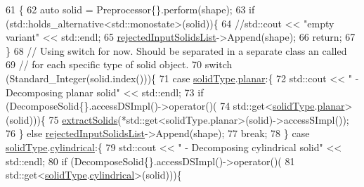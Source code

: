 \begin{DoxyCode}
61                                                                  \{
62     \textcolor{keyword}{auto} solid = Preprocessor\{\}.perform(shape);
63     \textcolor{keywordflow}{if} (std::holds\_alternative<std::monostate>(solid))\{
64         \textcolor{comment}{//std::cout << "empty variant" << std::endl;}
65         \hyperlink{classMcCAD_1_1Decomposition_1_1Decompose_1_1Impl_afa4c71b9552009320911095b0e9c638e}{rejectedInputSolidsList}->Append(shape);
66         \textcolor{keywordflow}{return};
67     \}
68     \textcolor{comment}{// Using switch for now. Should be separated in a separate class an called}
69     \textcolor{comment}{// for each specific type of solid object.}
70     \textcolor{keywordflow}{switch} (Standard\_Integer(solid.index()))\{
71     \textcolor{keywordflow}{case} \hyperlink{classMcCAD_1_1Decomposition_1_1Decompose_1_1Impl_a4d66091bde14a60985a5998376612a6c}{solidType}.\hyperlink{classMcCAD_1_1Tools_1_1SolidType_a69c62abbe9fa709ccbaf47d4daf356e1a03cc49496c89d07ea5f8ef75c4912243}{planar}:\{
72         std::cout << \textcolor{stringliteral}{"   - Decomposing planar solid"} << std::endl;
73         \textcolor{keywordflow}{if} (DecomposeSolid\{\}.accessDSImpl()->operator()(
74                     std::get<\hyperlink{classMcCAD_1_1Decomposition_1_1Decompose_1_1Impl_a4d66091bde14a60985a5998376612a6c}{solidType}.\hyperlink{classMcCAD_1_1Tools_1_1SolidType_a69c62abbe9fa709ccbaf47d4daf356e1a03cc49496c89d07ea5f8ef75c4912243}{planar}>(solid)))\{
75             \hyperlink{classMcCAD_1_1Decomposition_1_1Decompose_1_1Impl_a72d35db075f7a695c1bf3f99ccf8d8a8}{extractSolids}(*std::get<solidType.planar>(solid)->accessSImpl());
76         \} \textcolor{keywordflow}{else} \hyperlink{classMcCAD_1_1Decomposition_1_1Decompose_1_1Impl_afa4c71b9552009320911095b0e9c638e}{rejectedInputSolidsList}->Append(shape);
77         \textcolor{keywordflow}{break};
78     \} \textcolor{keywordflow}{case} \hyperlink{classMcCAD_1_1Decomposition_1_1Decompose_1_1Impl_a4d66091bde14a60985a5998376612a6c}{solidType}.\hyperlink{classMcCAD_1_1Tools_1_1SolidType_a69c62abbe9fa709ccbaf47d4daf356e1aed38f6feaeb26f0baf2614a0d421b638}{cylindrical}:\{
79         std::cout << \textcolor{stringliteral}{"   - Decomposing cylindrical solid"} << std::endl;
80         \textcolor{keywordflow}{if} (DecomposeSolid\{\}.accessDSImpl()->operator()(
81                     std::get<\hyperlink{classMcCAD_1_1Decomposition_1_1Decompose_1_1Impl_a4d66091bde14a60985a5998376612a6c}{solidType}.\hyperlink{classMcCAD_1_1Tools_1_1SolidType_a69c62abbe9fa709ccbaf47d4daf356e1aed38f6feaeb26f0baf2614a0d421b638}{cylindrical}>(solid)))\{

\end{DoxyCode}
